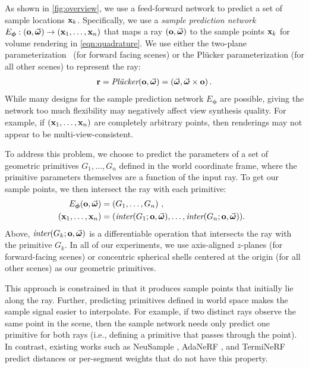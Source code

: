 \documentclass[10pt,twocolumn,letterpaper]{article}
\begin{document}
As shown in \cref{fig:overview}, we use a feed-forward network to predict a set of sample locations $\mathbf{x}_k$.
Specifically, we use a \emph{sample prediction network} $E_{\boldsymbol\phi} : \left(\mathbf{o}, \vec{\boldsymbol{\omega}}\right) \rightarrow \left(\mathbf{x}_1, \dots, \mathbf{x}_n \right)$ that maps a ray $(\mathbf{o}, \vec{\boldsymbol{\omega}})$ to the sample points $\mathbf{x}_k$ for volume rendering in \cref{eqn:quadrature}. 
We use either the two-plane parameterization~\cite{LevoyH1996} (for forward facing scenes) or the Plücker parameterization (for all other scenes) to represent the ray:
\begin{align}
    \mathbf{r} = \textit{Pl\"{u}cker}(\mathbf{o}, \vec{\boldsymbol{\omega}}) = \left( \vec{\boldsymbol{\omega}}, \vec{\boldsymbol{\omega}} \times \mathbf{o} \right) \text{.}
\end{align}
While many designs for the sample prediction network $E_{\boldsymbol\phi}$ are possible, giving the network too much flexibility may negatively affect view synthesis quality.
For example, if $\left(\mathbf{x}_1, \dots, \mathbf{x}_n \right)$ are completely arbitrary points, then renderings may not appear to be multi-view-consistent.

To address this problem, we choose to predict the parameters of a set of geometric primitives $G_1, \dots, G_n$ defined in the world coordinate frame, where the primitive parameters themselves are a function of the input ray.
To get our sample points, we then intersect the ray with each primitive:
\begin{align}
    \!\!\!\!E_{\boldsymbol\phi}(\mathbf{o}, \dirout) &= \left( G_1, \dots, G_n\right) \, , \\
    \!\!\!\!\left( \xpos_1, \dots, \xpos_n\right) &= \left(\textit{inter}(G_1; \mathbf{o}, \dirout), \dots,  \textit{inter}(G_n; \mathbf{o}, \dirout) \right) \!\text{.}
\end{align}
Above, $\textit{inter}(G_k; \mathbf{o}, \vec{\boldsymbol{\omega}})$ is a differentiable operation that intersects the ray with the primitive $G_k$. 
In all of our experiments, we use axis-aligned $z$-planes (for forward-facing scenes) or concentric spherical shells centered at the origin (for all other scenes) as our geometric primitives.

This approach is constrained in that it produces sample points that initially lie along the ray. Further, predicting primitives defined in world space makes the sample signal easier to interpolate. 
For example, if two distinct rays observe the same point in the scene, then the sample network needs only predict one primitive for both rays (i.e., defining a primitive that passes through the point). 
In contrast, existing works such as NeuSample \cite{FangXWZLT2021}, AdaNeRF \cite{KurzNLZS2022}, and TermiNeRF \cite{PialaC2021} predict distances or per-segment weights that do not have this property.
\end{document}
